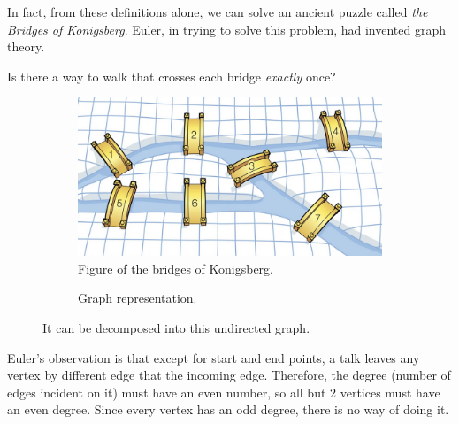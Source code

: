 \documentclass{article}
\begin{document}
    In fact, from these definitions alone, we can solve an ancient puzzle called \textit{the Bridges of Konigsberg}. Euler, in trying to solve this problem, had invented graph theory. 

    \begin{example}
      Is there a way to walk that crosses each bridge \textit{exactly} once? 

      \begin{figure}[H]
        \centering
        \begin{subfigure}[b]{0.48\textwidth}
        \centering
          \includegraphics[scale=0.4]{img/bridges.png}
          \caption{Figure of the bridges of Konigsberg.}
          \label{fig:bridges}
        \end{subfigure}
        \hfill 
        \begin{subfigure}[b]{0.48\textwidth}
        \centering
          \caption{Graph representation. }
          \label{fig:graph_bridges}
        \end{subfigure}
        \caption{It can be decomposed into this undirected graph.}
        \label{fig:konigsberg}
      \end{figure}
       
      Euler's observation is that except for start and end points, a talk leaves any vertex by different edge that the incoming edge. Therefore, the degree (number of edges incident on it) must have an even number, so all but 2 vertices must have an even degree. Since every vertex has an odd degree, there is no way of doing it. 
    \end{example}
\end{document}
